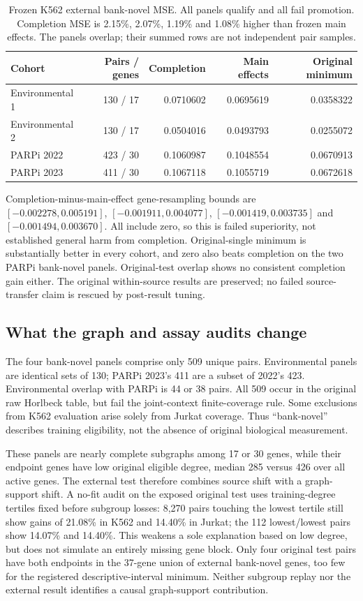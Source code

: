 \begin{table}[htbp]\centering\small
\begin{tabular}{lrrrr}\toprule
Cohort & Pairs / genes & Completion & Main effects & Original minimum\\\midrule
Environmental 1 & 130 / 17 & 0.0710602 & 0.0695619 & 0.0358322\\
Environmental 2 & 130 / 17 & 0.0504016 & 0.0493793 & 0.0255072\\
PARPi 2022 & 423 / 30 & 0.1060987 & 0.1048554 & 0.0670913\\
PARPi 2023 & 411 / 30 & 0.1067118 & 0.1055719 & 0.0672618\\\bottomrule
\end{tabular}
\caption{Frozen K562 external bank-novel MSE. All panels qualify and all fail promotion. Completion MSE is 2.15\%, 2.07\%, 1.19\% and 1.08\% higher than frozen main effects. The panels overlap; their summed rows are not independent pair samples.}
\label{tab:growth-external}\end{table}

Completion-minus-main-effect gene-resampling bounds are $[-0.002278,0.005191]$, $[-0.001911,0.004077]$, $[-0.001419,0.003735]$ and $[-0.001494,0.003670]$. All include zero, so this is failed superiority, not established general harm from completion. Original-single minimum is substantially better in every cohort, and zero also beats completion on the two PARPi bank-novel panels. Original-test overlap shows no consistent completion gain either. The original within-source results are preserved; no failed source-transfer claim is rescued by post-result tuning.

\subsection{What the graph and assay audits change}
The four bank-novel panels comprise only 509 unique pairs. Environmental panels are identical sets of 130; PARPi 2023's 411 are a subset of 2022's 423. Environmental overlap with PARPi is 44 or 38 pairs. All 509 occur in the original raw Horlbeck table, but fail the joint-context finite-coverage rule. Some exclusions from K562 evaluation arise solely from Jurkat coverage. Thus ``bank-novel'' describes training eligibility, not the absence of original biological measurement.

These panels are nearly complete subgraphs among 17 or 30 genes, while their endpoint genes have low original eligible degree, median 285 versus 426 over all active genes. The external test therefore combines source shift with a graph-support shift. A no-fit audit on the exposed original test uses training-degree tertiles fixed before subgroup losses: 8,270 pairs touching the lowest tertile still show gains of 21.08\% in K562 and 14.40\% in Jurkat; the 112 lowest/lowest pairs show 14.07\% and 14.40\%. This weakens a sole explanation based on low degree, but does not simulate an entirely missing gene block. Only four original test pairs have both endpoints in the 37-gene union of external bank-novel genes, too few for the registered descriptive-interval minimum. Neither subgroup replay nor the external result identifies a causal graph-support contribution.

